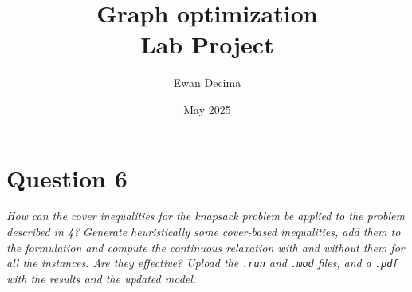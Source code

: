 \documentclass[10pt]{article}
\begin{document}
	\title{Graph optimization \\ Lab Project}
	\author{Ewan Decima}
	\date{May 2025}

	\maketitle

	\tableofcontents
	\newpage

	
	\newpage

	
	\newpage

	
	\newpage

	
	\newpage

	
	\newpage

    \section*{Question 6}
    \textit{How can the cover inequalities for the knapsack problem be applied to the problem described in 4? Generate heuristically some cover-based inequalities, add them to the formulation and compute the continuous relaxation with and without them for all the instances. Are they effective? Upload the \texttt{.run} and \texttt{.mod} files, and a \texttt{.pdf} with the results and the updated model.}
\end{document}
